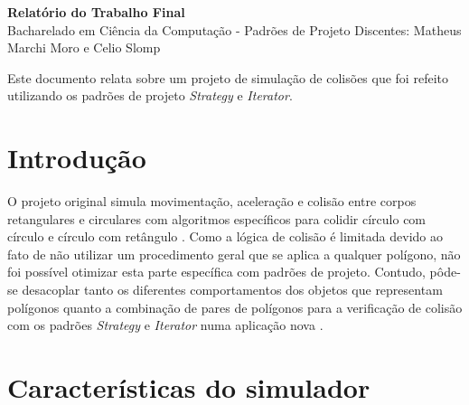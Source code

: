 \documentclass[11pt]{article}
\begin{document}
\vspace{0.5cm}
\noindent


\begin{minipage}{0.8\textwidth}
    \LARGE \textbf{Relatório do Trabalho Final}\\
    \Large Bacharelado em Ciência da Computação - Padrões de Projeto
    \Large Discentes: Matheus Marchi Moro e Celio Slomp
\end{minipage}

\pagestyle {plain}
\vspace{0.5cm}
  
Este documento relata sobre um projeto de simulação de colisões que foi refeito utilizando os padrões de projeto \textit{Strategy} e \textit{Iterator}.

\vspace{0.5cm}
  
\section{Introdução}

\vspace{0.5cm}

O projeto original \cite{simulador_padroes} simula movimentação, aceleração e colisão entre corpos retangulares e circulares com algoritmos específicos para colidir círculo com círculo e círculo com retângulo \cite{colisao_circulo_circulo} \cite{colisao_circulo_retangulo}. Como a lógica de colisão é limitada devido ao fato de não utilizar um procedimento geral que se aplica a qualquer polígono, não foi possível otimizar esta parte específica com padrões de projeto. Contudo, pôde-se desacoplar tanto os diferentes comportamentos dos objetos que representam polígonos quanto a combinação de pares de polígonos para a verificação de colisão com os padrões \textit{Strategy} e \textit{Iterator} numa aplicação nova \cite{simulador_poo2}.

\section{Características do simulador}
\end{document}
